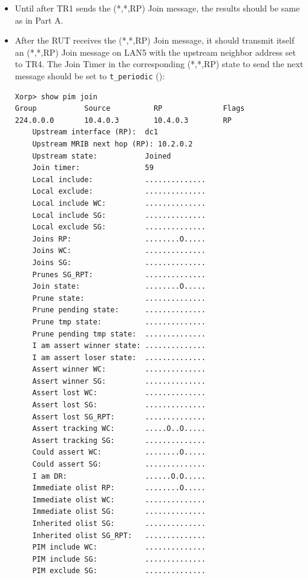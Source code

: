 \documentclass[11pt]{report}
\begin{document}

\begin{itemize}

  \item Until after TR1 sends the (*,*,RP) Join message, the results should be
  same as in Part A.

  \item After the RUT receives the (*,*,RP) Join message, it should
  transmit itself an (*,*,RP) Join message on LAN5 with the upstream
  neighbor address set to TR4. The Join Timer in the corresponding (*,*,RP)
  state to send the next message should be set to \verb=t_periodic=
  ({\PimsmTPeriodic}):

\begin{verbatim}
Xorp> show pim join 
Group           Source          RP              Flags
224.0.0.0       10.4.0.3        10.4.0.3        RP   
    Upstream interface (RP):  dc1
    Upstream MRIB next hop (RP): 10.2.0.2
    Upstream state:           Joined 
    Join timer:               59
    Local include:            ..............
    Local exclude:            ..............
    Local include WC:         ..............
    Local include SG:         ..............
    Local exclude SG:         ..............
    Joins RP:                 ........O.....
    Joins WC:                 ..............
    Joins SG:                 ..............
    Prunes SG_RPT:            ..............
    Join state:               ........O.....
    Prune state:              ..............
    Prune pending state:      ..............
    Prune tmp state:          ..............
    Prune pending tmp state:  ..............
    I am assert winner state: ..............
    I am assert loser state:  ..............
    Assert winner WC:         ..............
    Assert winner SG:         ..............
    Assert lost WC:           ..............
    Assert lost SG:           ..............
    Assert lost SG_RPT:       ..............
    Assert tracking WC:       .....O..O.....
    Assert tracking SG:       ..............
    Could assert WC:          ........O.....
    Could assert SG:          ..............
    I am DR:                  ......O.O.....
    Immediate olist RP:       ........O.....
    Immediate olist WC:       ..............
    Immediate olist SG:       ..............
    Inherited olist SG:       ..............
    Inherited olist SG_RPT:   ..............
    PIM include WC:           ..............
    PIM include SG:           ..............
    PIM exclude SG:           ..............
\end{verbatim}


\end{itemize}
\end{document}
